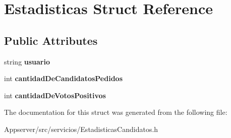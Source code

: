 \hypertarget{structEstadisticas}{}\section{Estadisticas Struct Reference}
\label{structEstadisticas}
\subsection*{Public Attributes}
\begin{DoxyCompactItemize}
\item 
string {\bfseries usuario}\hypertarget{structEstadisticas_a34fd4a5ca7aef637cb68968fb21158e1}{}\label{structEstadisticas_a34fd4a5ca7aef637cb68968fb21158e1}

\item 
int {\bfseries cantidad\+De\+Candidatos\+Pedidos}\hypertarget{structEstadisticas_aeced7a8c6a195eb0f67860449af9970e}{}\label{structEstadisticas_aeced7a8c6a195eb0f67860449af9970e}

\item 
int {\bfseries cantidad\+De\+Votos\+Positivos}\hypertarget{structEstadisticas_a7d84124f5d54b25bc964ecd241ea6fc3}{}\label{structEstadisticas_a7d84124f5d54b25bc964ecd241ea6fc3}

\end{DoxyCompactItemize}


The documentation for this struct was generated from the following file\+:\begin{DoxyCompactItemize}
\item 
Appserver/src/servicios/Estadisticas\+Candidatos.\+h\end{DoxyCompactItemize}
